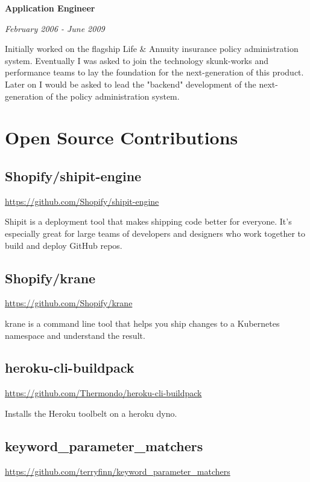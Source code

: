 \documentclass[12pt letterpaper notitlepage]{article}
\begin{document}
\textbf{Application Engineer}

\emph{February 2006 - June 2009}

Initially worked on the flagship Life \& Annuity insurance policy administration system. Eventually I was asked to join the technology skunk-works and performance teams to lay the foundation for the next-generation of this product. Later on I would be asked to lead the "backend" development of the next-generation of the policy administration system.

\section*{Open Source Contributions}
\label{sec:org8e1880c}

\subsection*{Shopify/shipit-engine}
\label{sec:orgea6b725}

\url{https://github.com/Shopify/shipit-engine}

Shipit is a deployment tool that makes shipping code better for everyone. It's especially great for large teams of developers and designers who work together to build and deploy GitHub repos.

\subsection*{Shopify/krane}
\label{sec:org3cc71ae}

\url{https://github.com/Shopify/krane}

krane is a command line tool that helps you ship changes to a Kubernetes namespace and understand the result.

\subsection*{heroku-cli-buildpack}
\label{sec:org48d538b}

\url{https://github.com/Thermondo/heroku-cli-buildpack}

Installs the Heroku toolbelt on a heroku dyno.

\subsection*{keyword\_parameter\_matchers}
\label{sec:org670b36f}

\url{https://github.com/terryfinn/keyword\_parameter\_matchers}
\end{document}
